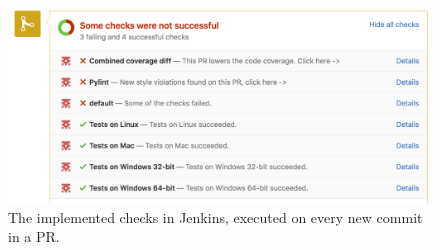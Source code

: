 \begin{figure}[h!]
	\centering
	\includegraphics[width=1.0\columnwidth]{images/improving_qa/jenkins_checks}
	\caption{The implemented checks in Jenkins, executed on every new commit in a PR.}
	\label{fig:jenkins-check}
\end{figure}